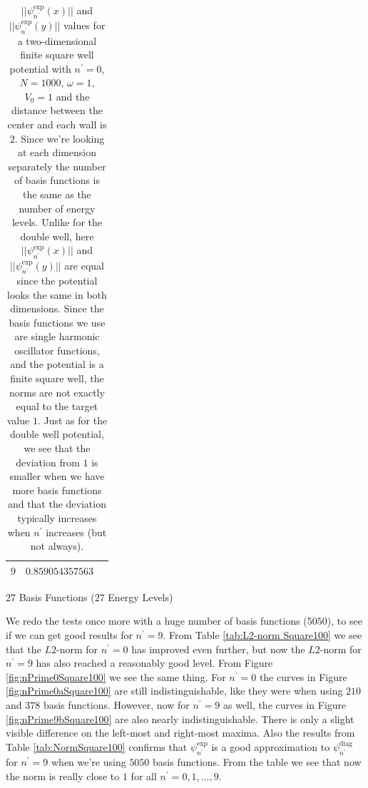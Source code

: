 \documentclass[../main.tex]{subfiles}
\begin{document}
\begin{table}[!ht]
\begin{subtable}{.4\linewidth}
\begin{tabular}{ | c | c | c | }
        \hline
        $9$ & $0.859054357563$\\*
        \hline
    \end{tabular}
    \caption{$27$ Basis Functions ($27$ Energy Levels)}
    \label{tab:NormE27Square}
  \end{subtable}
  \caption{$||\psi_{n^\prime}^\textrm{exp}(x)||$ and $||\psi_{n^\prime}^\textrm{exp}(y)||$ values for a two-dimensional finite square well potential with $n^\prime = 0$, $N=1000$, $\omega = 1$, $V_0 = 1$ and the distance between the center and each wall is $2$. Since we're looking at each dimension separately the number of basis functions is the same as the number of energy levels. Unlike for the double well, here $||\psi_{n^\prime}^\textrm{exp}(x)||$ and $||\psi_{n^\prime}^\textrm{exp}(y)||$ are equal since the potential looks the same in both dimensions. Since the basis functions we use are single harmonic oscillator functions, and the potential is a finite square well, the norms are not exactly equal to the target value $1$. Just as for the double well potential, we see that the deviation from $1$ is smaller when we have more basis functions and that the deviation typically increases when $n^\prime$ increases (but not always).}
  \label{tab:NormSquare}
\end{table}

We redo the tests once more with a huge number of basis functions ($5050$), to see if we can get good results for $n^\prime = 9$. From Table \ref{tab:L2-norm Square100} we see that the $L2$-norm for $n^\prime = 0$ has improved even further, but now the $L2$-norm for $n^\prime = 9$ has also reached a reasonably good level. From Figure \ref{fig:nPrime0Square100} we see the same thing. For $n^\prime = 0$ the curves in Figure \ref{fig:nPrime0aSquare100} are still indistinguishable, like they were when using $210$ and $378$ basis functions. However, now for $n^\prime = 9$ as well, the curves in Figure \ref{fig:nPrime9bSquare100} are also nearly indistinguishable. There is only a slight visible difference on the left-most and right-most maxima. Also the results from Table \ref{tab:NormSquare100} confirms that $\psi_{n^\prime}^\textrm{exp}$ is a good approximation to $\psi_{n^\prime}^\textrm{diag}$ for $n^\prime = 9$ when we're using $5050$ basis functions. From the table we see that now the norm is really close to $1$ for all $n^\prime = 0,1,\dots,9$. 
\end{document}
